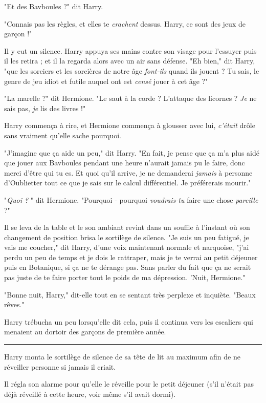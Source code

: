 "Et des Bavboules ?" dit Harry.

"Connais pas les règles, et elles te \emph{crachent}  dessus. Harry, ce sont des jeux de garçon !"

Il y eut un silence. Harry appuya ses mains contre son visage pour l'essuyer puis il les retira ; et il la regarda alors avec un air sans défense. "Eh bien," dit Harry, "que les sorciers et les sorcières de notre âge \emph{font-ils}  quand ils jouent ? Tu sais, le genre de jeu idiot et futile auquel ont est \emph{censé } jouer à cet âge ?"

"La marelle ?" dit Hermione. "Le saut à la corde ? L'attaque des licornes ? \emph{Je}  ne sais pas, \emph{je}  lis des livres !"

Harry commença à rire, et Hermione commença à glousser avec lui, \emph{c'était}  drôle sans vraiment qu'elle sache pourquoi.

"J'imagine que ça aide un peu," dit Harry. "En fait, je pense que ça m'a plus aidé que jouer aux Bavboules pendant une heure n'aurait jamais pu le faire, donc merci d'être qui tu es. Et quoi qu'il arrive, je ne demanderai \emph{jamais}  à personne d'Oublietter tout ce que je sais sur le calcul différentiel. Je préférerais mourir."

"\emph{Quoi ?} " dit Hermione. "Pourquoi - pourquoi \emph{voudrais-tu } faire une chose \emph{pareille}  ?"

Il se leva de la table et le son ambiant revint dans un souffle à l'instant où son changement de position brisa le sortilège de silence. "Je suis un peu fatigué, je vais me coucher," dit Harry, d'une voix maintenant normale et narquoise, "j'ai perdu un peu de temps et je dois le rattraper, mais je te verrai au petit déjeuner puis en Botanique, si ça ne te dérange pas. Sans parler du fait que ça ne serait pas juste de te faire porter tout le poids de ma dépression. 'Nuit, Hermione."

"Bonne nuit, Harry," dit-elle tout en se sentant très perplexe et inquiète. "Beaux rêves."

Harry trébucha un peu lorsqu'elle dit cela, puis il continua vers les escaliers qui menaient au dortoir des garçons de première année.
\par\noindent\rule{\textwidth}{0.4pt}
Harry monta le sortilège de silence de sa tête de lit au maximum afin de ne réveiller personne si jamais il criait.

Il régla son alarme pour qu'elle le réveille pour le petit déjeuner (s'il n'était pas déjà réveillé à cette heure, voir même s'il avait dormi).

